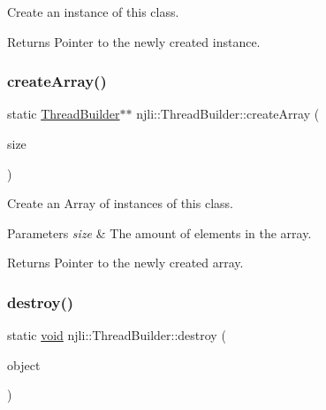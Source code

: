 Create an instance of this class.

\begin{DoxyReturn}{Returns}
Pointer to the newly created instance. 
\end{DoxyReturn}
\mbox{\label{classnjli_1_1_thread_builder_a602cd7eca7d3c71df536c32e430cadaf}} 
\subsubsection{\texorpdfstring{create\+Array()}{createArray()}}
{\footnotesize\ttfamily static \mbox{\hyperlink{classnjli_1_1_thread_builder}{Thread\+Builder}}$\ast$$\ast$ njli\+::\+Thread\+Builder\+::create\+Array (\begin{DoxyParamCaption}\item[{const \mbox{\hyperlink{_util_8h_a10e94b422ef0c20dcdec20d31a1f5049}{u32}}}]{size }\end{DoxyParamCaption})\hspace{0.3cm}{\ttfamily [static]}}

Create an Array of instances of this class.


\begin{DoxyParams}{Parameters}
{\em size} & The amount of elements in the array.\\
\hline
\end{DoxyParams}
\begin{DoxyReturn}{Returns}
Pointer to the newly created array. 
\end{DoxyReturn}
\mbox{\label{classnjli_1_1_thread_builder_a7165d5e0c4523d1174d7d660d8701081}} 
\subsubsection{\texorpdfstring{destroy()}{destroy()}}
{\footnotesize\ttfamily static \mbox{\hyperlink{_thread_8h_af1e856da2e658414cb2456cb6f7ebc66}{void}} njli\+::\+Thread\+Builder\+::destroy (\begin{DoxyParamCaption}\item[{\mbox{\hyperlink{classnjli_1_1_thread_builder}{Thread\+Builder}} $\ast$}]{object }\end{DoxyParamCaption})\hspace{0.3cm}{\ttfamily [static]}}

